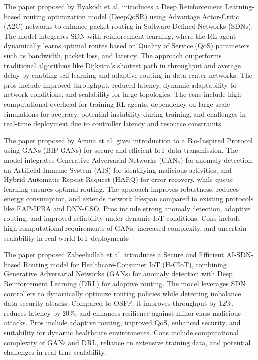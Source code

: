\documentclass[a4paper,fleqn]{cas-dc}
\numberwithin{equation}{section}
\begin{document}
The paper proposed by Byakodi et al.\cite{Byakodi2023} introduces a Deep Reinforcement Learning-based routing optimization model (DeepQoSR) using Advantage Actor-Critic (A2C) networks to enhance packet routing in Software-Defined Networks (SDNs). The model integrates SDN with reinforcement learning, where the RL agent dynamically learns optimal routes based on Quality of Service (QoS) parameters such as bandwidth, packet loss, and latency. The approach outperforms traditional algorithms like Dijkstra’s shortest path in throughput and average delay by enabling self-learning and adaptive routing in data center networks. The pros include improved throughput, reduced latency, dynamic adaptability to network conditions, and scalability for large topologies. The cons include high computational overhead for training RL agents, dependency on large-scale simulations for accuracy, potential instability during training, and challenges in real-time deployment due to controller latency and resource constraints. 

The paper proposed by Aruna et al.\cite{devi2024robust} gives introduction to a Bio-Inspired Protocol using GANs (BIP-GANs) for secure and efficient IoT data transmission. The model integrates Generative Adversarial Networks (GANs) for anomaly detection, an Artificial Immune System (AIS) for identifying malicious activities, and Hybrid Automatic Repeat Request (HARQ) for error recovery, while queue learning ensures optimal routing. The approach improves robustness, reduces energy consumption, and extends network lifespan compared to existing protocols like EAP-IFBA and DNN-CSO. Pros include strong anomaly detection, adaptive routing, and improved reliability under dynamic IoT conditions. Cons include high computational requirements of GANs, increased complexity, and uncertain scalability in real-world IoT deployments

The paper proposed Zabeehullah et al.\cite{khan2024secure} introduces a Secure and Efficient AI-SDN-based Routing model for Healthcare-Consumer IoT (H-CIoT), combining Generative Adversarial Networks (GANs) for anomaly detection with Deep Reinforcement Learning (DRL) for adaptive routing. The model leverages SDN controllers to dynamically optimize routing policies while detecting imbalance data security attacks. Compared to OSPF, it improves throughput by 12\%, reduces latency by 20\%, and enhances resilience against minor-class malicious attacks. Pros include adaptive routing, improved QoS, enhanced security, and suitability for dynamic healthcare environments. Cons include computational complexity of GANs and DRL, reliance on extensive training data, and potential challenges in real-time scalability.
\end{document}
